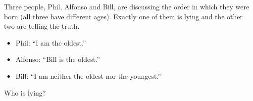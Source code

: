 Three people, Phil, Alfonso and Bill, are discussing the order in which they were born (all three have different ages). Exactly one of them is lying and the other two are telling the truth.
\begin{itemize}
\item Phil: ``I am the oldest.''
\item Alfonso: ``Bill is the oldest.''
\item Bill: ``I am neither the oldest nor the youngest.''
\end{itemize}
Who is lying?
